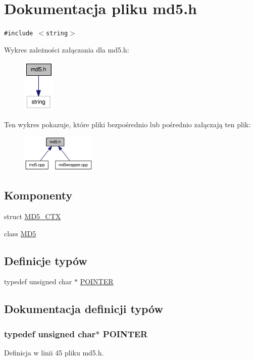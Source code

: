 \hypertarget{a00011}{
\section{Dokumentacja pliku md5.h}
\label{da/d45/a00011}
}
{\tt \#include $<$string$>$}\par


Wykres zależności załączania dla md5.h:\nopagebreak
\begin{figure}[H]
\begin{center}
\leavevmode
\includegraphics[width=43pt]{d5/db6/a00042}
\end{center}
\end{figure}


Ten wykres pokazuje, które pliki bezpośrednio lub pośrednio załączają ten plik:\nopagebreak
\begin{figure}[H]
\begin{center}
\leavevmode
\includegraphics[width=101pt]{d6/d42/a00043}
\end{center}
\end{figure}
\subsection*{Komponenty}
\begin{CompactItemize}
\item 
struct \hyperlink{a00003}{MD5\_\-CTX}
\item 
class \hyperlink{a00002}{MD5}
\end{CompactItemize}
\subsection*{Definicje typów}
\begin{CompactItemize}
\item 
typedef unsigned char $\ast$ \hyperlink{a00011_73204e40637f83518fb695362ea084a4}{POINTER}
\end{CompactItemize}


\subsection{Dokumentacja definicji typów}
\hypertarget{a00011_73204e40637f83518fb695362ea084a4}{
\subsubsection[{POINTER}]{\setlength{\rightskip}{0pt plus 5cm}typedef unsigned char$\ast$ {\bf POINTER}}}
\label{da/d45/a00011_73204e40637f83518fb695362ea084a4}




Definicja w linii 45 pliku md5.h.